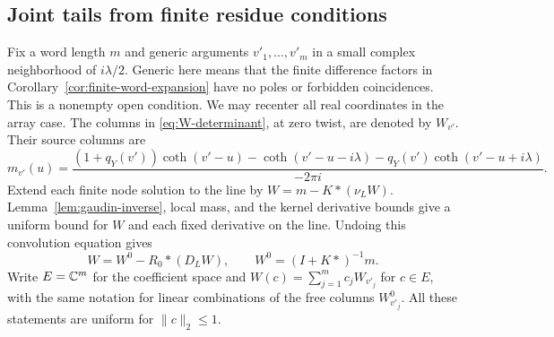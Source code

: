 \subsection{Joint tails from finite residue conditions}

Fix a word length $m$ and generic arguments $v'_1,\ldots,v'_m$
in a small complex neighborhood of $i\lambda/2$.  Generic here
means that the finite difference factors in
Corollary~\ref{cor:finite-word-expansion} have no poles or forbidden
coincidences.  This is a nonempty open condition.
We may recenter all real coordinates in the array case.
The columns in \eqref{eq:W-determinant}, at zero twist, are denoted
by $W_{v'}$.  Their source columns are
\begin{equation}\label{eq:thermodynamic-source-column}
 m_{v'}(u)=
 \frac{(1+q_Y(v'))\coth(v'-u)-\coth(v'-u-i\lambda)
                       -q_Y(v')\coth(v'-u+i\lambda)}
      {-2\pi i}.
\end{equation}
Extend each finite node solution to the line by
$W=m-K*(\nu_LW)$.  Lemma~\ref{lem:gaudin-inverse}, local mass,
and the kernel derivative bounds give a uniform bound for $W$
and each fixed derivative on the line.  Undoing this convolution
equation gives
\begin{equation}\label{eq:finite-dressing-equation}
 W=W^0-R_0*(D_LW),\qquad W^0=(I+K*)^{-1}m.
\end{equation}
Write $E=\mathbb C^m$ for the coefficient space and
$W(c)=\sum_{j=1}^m c_jW_{v'_j}$ for $c\in E$, with the same
notation for linear combinations of the free columns $W^0_{v'_j}$.
All these statements are uniform for $\|c\|_2\le1$.

